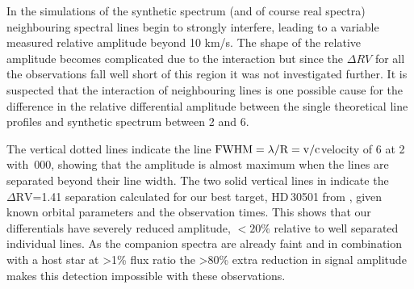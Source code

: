 In the simulations of the synthetic spectrum (and of course real spectra) neighbouring spectral lines begin to strongly interfere, leading to a variable measured relative amplitude beyond 10 km/s. The shape of the relative amplitude becomes complicated due to the interaction but since the \(\Delta {RV}\) for all the observations fall well short of this region it was not investigated further. It is suspected that the interaction of neighbouring lines is one possible cause for the difference in the relative differential amplitude between the single theoretical line profiles and synthetic spectrum between 2 and 6\kmps{}. 

The vertical dotted lines indicate the line \(\rm {\textrm{FWHM}} = \lambda /\textrm{R}=v /c \)velocity of 6\kmps{} at 2\um{} with \,000, showing that the amplitude is almost maximum when the lines are separated beyond their line width. The two solid vertical lines in  indicate the \(\Delta \textrm{RV}\)=1.41\kmps{} separation calculated for our best target, {HD\,30501} from , given known orbital parameters and the observation times. This shows that our differentials have severely reduced amplitude, \(<20\%\) relative to well separated individual lines. As the companion spectra are already faint and in combination with a host star at >1\% flux ratio the >80\% extra reduction in signal amplitude makes this detection impossible with these observations.

